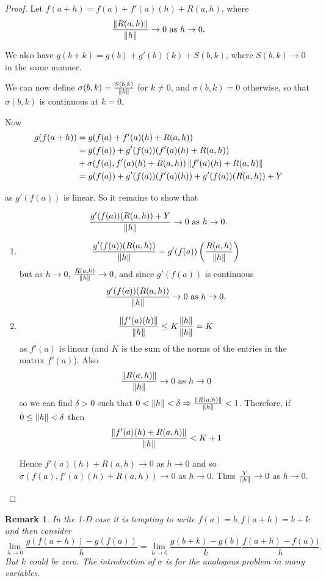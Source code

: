 \documentclass{notes}
\theoremstyle{plain}
\newtheorem*{remark}{Remark}
\begin{document}
\begin{proof}

Let $f(a+h)=f(a)+f'(a)(h) + R(a,h)$, where
\[
\frac{ \left\|R(a,h)\right\|}{\left\|h\right\|} \to 0 \text{ as } h \to 0.
\]

We also have $g(b+k) =g(b)+g'(b)(k)+S(b,k)$, where $S(b,k) 
\to 0$ in the same manner.

We can now define $\sigma(b,k) = \frac{S(b,k)}{\left\|k\right\|}$ for
$ k \neq 0 $, and $ \sigma(b,k)=0 $ otherwise, so that
$ \sigma(b,k) $ is continuous at $ k=0 $.

Now
\begin{align*}
 g(f(a+h)) &= g(f(a)+f'(a)(h)+R(a,h)) \\
&= g(f(a))+g'(f(a))(f'(a)(h)+R(a,h))\\
&+ \sigma(f(a),f'(a)(h)+R(a,h))
\left\|f'(a)(h)+R(a,h)\right\| \\
&= g(f(a))+g'(f(a))(f'(a)(h))+g'(f(a))(R(a,h))+Y 
\end{align*}
 
as $ g'(f(a))  $ is linear.
So it remains to show that

\[
\frac{g'(f(a))(R(a,h))+Y}{\left\|h\right\|} \to 0 \text{ as } h \to 0.
\]

\begin{enumerate}
\item
\[ \frac{g'(f(a))(R(a,h))}{\left\|h\right\|} = g'(f(a)) \left( 
\frac{R(a,h)}{\left\|h\right\|} \right) \]
but as $ h \to 0 $, $ \frac{R(a,h)}{\left\|h\right\|}\to 0 $, and
since $ g'(f(a)) $ is continuous
\[
\frac{g'(f(a))(R(a,h))}{\left\|h\right\|} \to 0 \text{ as }
h \to 0.
\]

\item 
\[ \frac{ \left\|f'(a)(h)\right\|}{\left\|h\right\|} \leq K 
\frac{\left\|h\right\|}{\left\|h\right\|} = K \]
as $ f'(a) $ is linear (and $ K $ is the sum of the norms of the 
entries in the matrix $ f'(a) $).
Also
\[
\frac{\left\|R(a,h)\right\|}{\left\|h\right\|} \to 0 \text{ as }
h \to 0
\]
so we can find $ \delta >0 $ such that $ 0 < \left\|h\right\| < \delta 
\Rightarrow \frac{\left\|R(a,h)\right\|}{\left\|h\right\|} < 1$.
Therefore, if $ 0 \leq \left\|h\right\| < \delta $ then 
\[ \frac{ \left\|f'(a)(h) + R(a,h)\right\|}{\left\|h\right\|} < K+1 \]

Hence $f'(a)(h)+R(a,h) \to 0$ as $ h \to 0 $ and 
so $\sigma(f(a),f'(a)(h) + R(a,h)) \to 0$ as $ h 
\to 0 $.
Thus $ \frac{Y}{\left\|h\right\|} \to 0 $ as $ h \to 0 $.
\end{enumerate}
\end{proof}

\begin{remark} In the 1-D case it is tempting to write $ f(a)=b, f(a+h)=b+k $ 
and then consider
\[
\lim_{h \to 0}\frac{g(f(a+h))-g(f(a))}{h} = \lim_{h 
\to 0}\frac{g(b+k)-g(b)}{k}\frac{f(a+h)-f(a))}{h}.
\]
But $ k $ could be zero.
The introduction of $ \sigma $ is for the analogous problem in many 
variables.
\end{remark}
\end{document}
